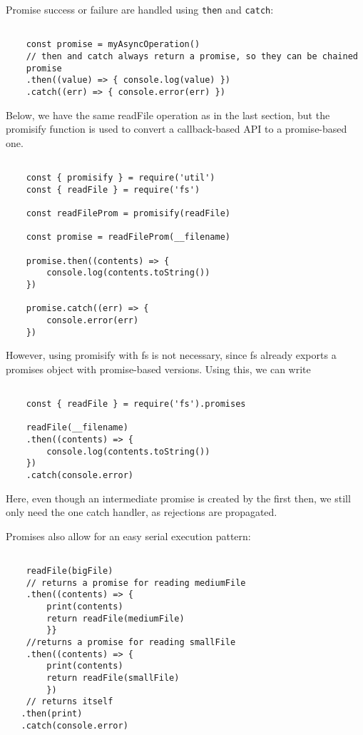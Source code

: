 \documentclass{scrartcl}
\begin{document}
Promise success or failure are handled using \lstinline|then| and \lstinline|catch|:

\begin{lstlisting}[style=ES6]

    const promise = myAsyncOperation()
    // then and catch always return a promise, so they can be chained
    promise
    .then((value) => { console.log(value) })
    .catch((err) => { console.error(err) })

\end{lstlisting}

Below, we have the same readFile operation as in the last section, but the promisify function is used to convert a callback-based API to a promise-based one.

\begin{lstlisting}[style=ES6]

    const { promisify } = require('util')
    const { readFile } = require('fs')

    const readFileProm = promisify(readFile)

    const promise = readFileProm(__filename)

    promise.then((contents) => {
        console.log(contents.toString())
    })

    promise.catch((err) => {
        console.error(err)
    })
\end{lstlisting}

However, using promisify with fs is not necessary, since fs already exports a promises object with promise-based versions. Using this, we can write

\begin{lstlisting}[style=ES6]

    const { readFile } = require('fs').promises

    readFile(__filename)
    .then((contents) => {
        console.log(contents.toString())
    })
    .catch(console.error)
\end{lstlisting}

Here, even though an intermediate promise is created by the first then, we still only need the one catch handler, as rejections are propagated.

Promises also allow for an easy serial execution pattern:

\begin{lstlisting}[style=ES6]

    readFile(bigFile)
    // returns a promise for reading mediumFile
    .then((contents) => {
        print(contents)
        return readFile(mediumFile)
        }}
    //returns a promise for reading smallFile
    .then((contents) => {
        print(contents)
        return readFile(smallFile)
        })
    // returns itself
   .then(print)
   .catch(console.error)

\end{lstlisting}
\end{document}
